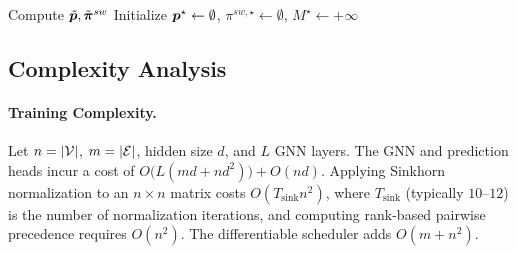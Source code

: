 \begin{algorithm}[!htbp]
\caption{Discrete Inference and Post-Processing}
\label{alg:diffgnn_inference}

Compute $\tilde{{\bm{p}}},\tilde{\bm{\pi}}^{sw}$\;
Initialize ${\bm{p}}^\star \gets \emptyset$, $\pi^{sw,\star}\gets\emptyset$, $M^\star \gets +\infty$\;

\;
\end{algorithm}




\subsection{Complexity Analysis}

\paragraph{\textbf{Training Complexity.}}
Let $n=|{\mathcal{V}}|$, $m=|{\mathcal{E}}|$, hidden size $d$, and $L$ GNN layers. The GNN and prediction heads incur a cost of $O\!\big(L(md + nd^2)\big) + O(nd)$. Applying Sinkhorn normalization to an $n \times n$ matrix costs $O(T_{\mathrm{sink}} n^2)$, where $T_{\mathrm{sink}}$ (typically $10$--$12$) is the number of normalization iterations, and computing rank-based pairwise precedence requires $O(n^2)$. The differentiable scheduler adds $O(m + n^2)$.

